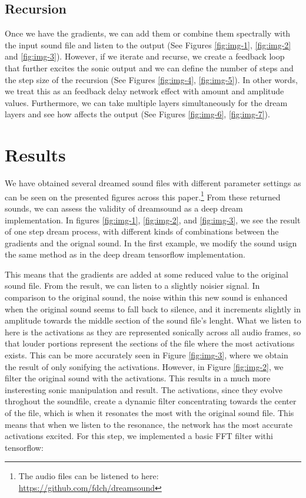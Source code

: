 \documentclass[a4paper,10pt,oneside]{article}
\begin{document}
\begin{sloppy}
\subsection{Recursion}
Once we have the gradients, we can add them or combine them spectrally with the input sound file and listen to the output (See Figures \ref{fig:img-1}, \ref{fig:img-2} and \ref{fig:img-3}). However, if we iterate and recurse, we create a feedback loop that further excites the sonic output and we can define the number of steps and the step size of the recursion (See Figures \ref{fig:img-4}, \ref{fig:img-5}). In other words, we treat this as an feedback delay network effect with amount and amplitude values. Furthermore, we can take multiple layers simultaneously for the dream layers and see how affects the output (See Figures \ref{fig:img-6}, \ref{fig:img-7}).


\section{Results}

We have obtained several dreamed sound files with different parameter settings as can be seen on the presented figures across this paper.\footnote{The audio files can be listened to here: \url{https://github.com/fdch/dreamsound}} From these returned sounds, we can assess the validity of dreamsound as a deep dream implementation. In figures \ref{fig:img-1}, \ref{fig:img-2}, and \ref{fig:img-3}, we see the result of one step dream process, with different kinds of combinations between the gradients and the orignal sound. In the first example, we modify the sound usign the same method as in the deep dream tensorflow implementation. 

This means that the gradients are added at some reduced value to the original sound file. From the result, we can listen to a slightly noisier signal. In comparison to the original sound, the noise within this new sound is enhanced when the original sound seems to fall back to silence, and it increments slightly in amplitude towards the middle section of the sound file's lenght. What we listen to here is the activations as they are represented sonically across all audio frames, so that louder portions represent the sections of the file where the most activations exists. This can be more accurately seen in Figure \ref{fig:img-3}, where we obtain the result of only sonifying the activations. However, in Figure \ref{fig:img-2}, we filter the original sound with the activations. This results in a much more insteresting sonic manipulation and result. The activations, since they evolve throghout the soundfile, create a dynamic filter concentrating towards the center of the file, which is when it resonates the most with the original sound file. This means that when we listen to the resonance, the network has the most accurate activations excited. For this step, we implemented a basic FFT filter withi tensorflow:


\end{sloppy}
\end{document}
